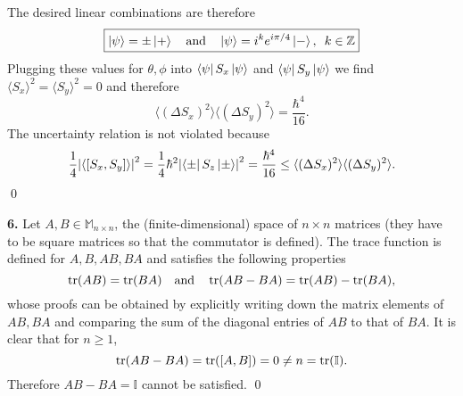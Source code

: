 \documentclass{article}
\theoremstyle{definition}
\newcommand{\f}[2]{\frac{#1}{#2}}
\begin{document}
The desired linear combinations are therefore
\begin{align*}
\boxed{\ket{\psi} = \pm \ket{+}\quad \text{and} \quad \ket{\psi} =  i^k e^{i\pi/4}\ket{-}, \,\,\, k\in \mathbb{Z}}
\end{align*}
Plugging these values for $\theta,\phi$ into $\bra{\psi} S_x \ket{\psi}$ and $\bra{\psi} S_y \ket{\psi}$ we find $\langle S_x\rangle^2 = \langle S_y\rangle^2 = 0$ and therefore
\begin{equation*}
\langle (\Delta S_x)^2\rangle \langle (\Delta S_y)^2\rangle = \f{\hbar^4}{16}.
\end{equation*}
The uncertainty relation is not violated because
\begin{equation*}
\f{1}{4}\abs{\langle [S_x, S_y]\rangle}^2 = \f{1}{4}\hbar^2 \abs{\bra{\pm}S_z\ket{\pm}}^2 = \f{\hbar^4}{16} \leq  \langle (\Delta S_x)^2\rangle \langle (\Delta S_y)^2\rangle.
\end{equation*}\qed
	
	
	
	
	
	
	
	
\newpage




\noindent \textbf{6.} Let $A,B \in \mathbb{M}_{n\times n}$, the (finite-dimensional) space of $n\times n$ matrices (they have to be square matrices so that the commutator is defined). The trace function is defined for $A,B,AB,BA$ and satisfies the following properties
\begin{equation*}
\tr(AB) = \tr(BA)  \quad \text{and} \quad \tr(AB-BA) = \tr(AB) - \tr(BA),
\end{equation*}
whose proofs can be obtained by explicitly writing down the matrix elements of $AB,BA$ and comparing the sum of the diagonal entries of $AB$ to that of $BA$. It is clear that for $n\geq 1$,
\begin{equation*}
\tr(AB-BA) = \tr([A,B]) = 0 \neq n = \tr(\mathbb{I}). 
\end{equation*}
Therefore $AB-BA = \mathbb{I}$ cannot be satisfied. \qed
	

\newpage
\end{document}
